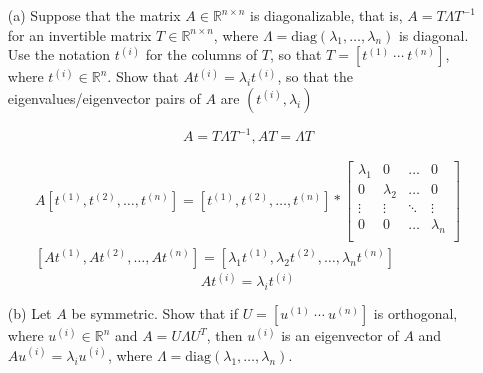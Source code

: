 \documentclass[11pt]{article}
\begin{document}
\begin{enumerate}
	\item[(a)]
Suppose that the matrix $A \in \mathbb{R}^{n \times n}$ is diagonalizable, that is, $A = T \Lambda T^{-1}$ for an invertible matrix $T \in \mathbb{R}^{n \times n}$, where $\Lambda = \text{diag}(\lambda_1, \ldots, \lambda_n)$ is diagonal. Use the notation $t^{(i)}$ for the columns of $T$, so that $T = \left[ t^{(1)} \ \cdots \ t^{(n)} \right]$, where $t^{(i)} \in \mathbb{R}^n$. Show that $A t^{(i)} = \lambda_i t^{(i)}$, so that the eigenvalues/eigenvector pairs of $A$ are $(t^{(i)}, \lambda_i)$
\newline
\newline
\newline
\newline


\color{blue}
\begin{equation*}
				A=T \Lambda T^{-1}, AT = \Lambda T 
\end{equation*}

\begin{equation*}
	\begin{aligned}
				A [t^{(1)}, t^{(2)}, \dots, t^{(n)}] = [t^{(1)}, t^{(2)}, \dots, t^{(n)}] * \begin{bmatrix}
\lambda_1 & 0 & \dots & 0 \\
0 & \lambda_2 & \dots & 0 \\
\vdots & \vdots & \ddots & \vdots \\
0 & 0 & \dots & \lambda_n \\
\end{bmatrix} \\
[At^{(1)}, At^{(2)}, \dots, At^{(n)}] = [\lambda_1 t^{(1)}, \lambda_2 t^{(2)}, \dots, \lambda_n t^{(n)}]
	\end{aligned}
\end{equation*}
\begin{equation*}
	At^{(i)} = \lambda_i t^{(i)}
\end{equation*}



%
\color{black}
\item[(b)] Let $A$ be symmetric. Show that if $U = \left[ u^{(1)} \ \cdots \ u^{(n)} \right]$ is orthogonal, where $u^{(i)} \in \mathbb{R}^n$ and $A = U \Lambda U^T$, then $u^{(i)}$ is an eigenvector of $A$ and $A u^{(i)} = \lambda_i u^{(i)}$, where $\Lambda = \text{diag}(\lambda_1, \ldots, \lambda_n)$.

\color{blue}


\end{enumerate}
\end{document}
